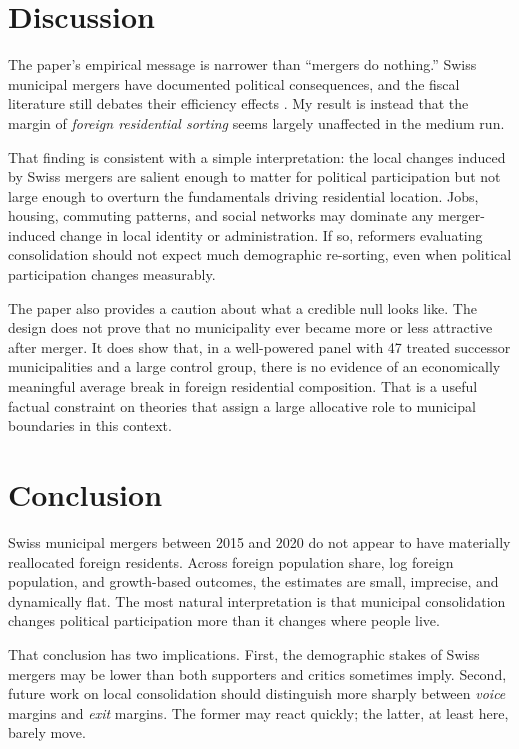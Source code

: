 \documentclass[12pt]{article}
\begin{document}
\section{Discussion}

The paper's empirical message is narrower than ``mergers do nothing.'' Swiss municipal mergers have documented political consequences, and the fiscal literature still debates their efficiency effects \citep{allers2016effects, ladner2009reforms, steiner2017assessing}. My result is instead that the margin of \emph{foreign residential sorting} seems largely unaffected in the medium run.

That finding is consistent with a simple interpretation: the local changes induced by Swiss mergers are salient enough to matter for political participation but not large enough to overturn the fundamentals driving residential location. Jobs, housing, commuting patterns, and social networks may dominate any merger-induced change in local identity or administration. If so, reformers evaluating consolidation should not expect much demographic re-sorting, even when political participation changes measurably.

The paper also provides a caution about what a credible null looks like. The design does not prove that no municipality ever became more or less attractive after merger. It does show that, in a well-powered panel with 47 treated successor municipalities and a large control group, there is no evidence of an economically meaningful average break in foreign residential composition. That is a useful factual constraint on theories that assign a large allocative role to municipal boundaries in this context.

\section{Conclusion}

Swiss municipal mergers between 2015 and 2020 do not appear to have materially reallocated foreign residents. Across foreign population share, log foreign population, and growth-based outcomes, the estimates are small, imprecise, and dynamically flat. The most natural interpretation is that municipal consolidation changes political participation more than it changes where people live.

That conclusion has two implications. First, the demographic stakes of Swiss mergers may be lower than both supporters and critics sometimes imply. Second, future work on local consolidation should distinguish more sharply between \emph{voice} margins and \emph{exit} margins. The former may react quickly; the latter, at least here, barely move.
\end{document}

